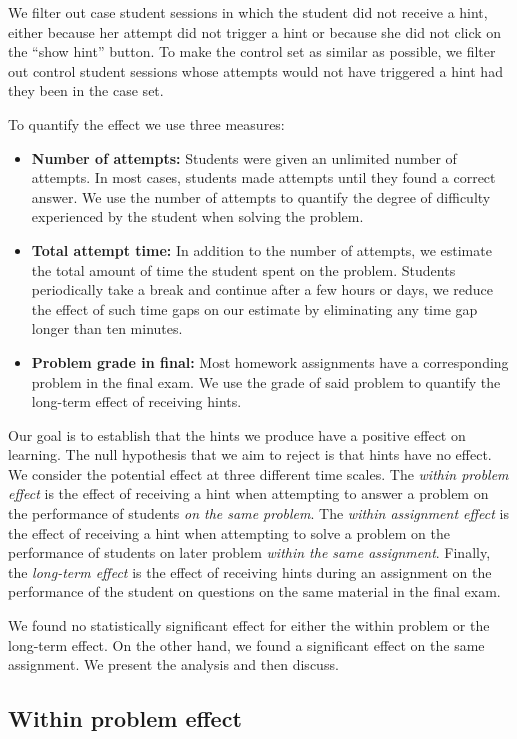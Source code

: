 \documentclass{llncs2e/llncs}
\begin{document}
We filter out case student sessions in which the student did not
receive a hint, either because her attempt did not trigger a hint or
because she did not click on the ``show hint'' button.  To make the
control set as similar as possible, we filter out control student
sessions whose attempts would not have triggered a hint had they been
in the case set.

To quantify the effect we use three measures:
\begin{itemize}
\item {\bf Number of attempts:} Students were given an unlimited number of attempts. In most cases, students made attempts until they found a correct answer. We use the number of attempts to quantify the degree of difficulty experienced by the student when solving the problem.

\item {\bf Total attempt time:} In addition to the number of attempts, we estimate the total amount of time the student spent on the problem. Students periodically take a break and continue after a few hours or days, we reduce the effect of such time gaps on our estimate by eliminating any time gap longer than ten minutes.
\item {\bf Problem grade in final:} Most homework assignments have a corresponding problem in the final exam. We use the grade of said problem to quantify the long-term effect of receiving hints. 
\end{itemize}

Our goal is to establish that the hints we produce have a positive effect on learning. The null hypothesis that we aim to reject is that hints have no effect. We consider the potential effect at three different time scales. The {\em within problem effect} is the effect of receiving a hint when attempting to answer a problem on the performance of students {\em on the same problem}. The {\em within assignment effect} is the effect of receiving a hint when attempting to solve a problem on the performance of students on later problem {\em within the same assignment}. Finally, the {\em long-term effect} is the effect of receiving hints during an assignment on the performance of the student on questions on the same material in the final exam.

We found no statistically significant effect for either the within problem or the long-term effect. On the other hand, we found a significant effect on the same assignment. We present the analysis and then discuss.

\subsection{Within problem effect}
\end{document}
